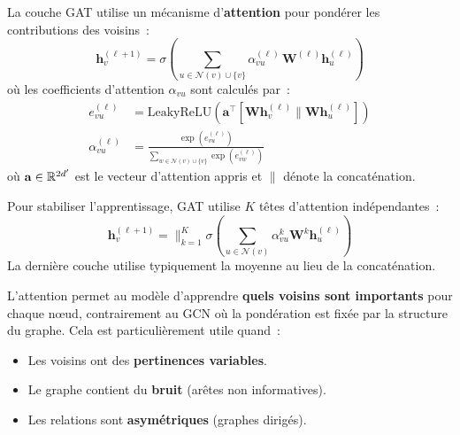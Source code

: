 \begin{definition}
La couche GAT utilise un m\'ecanisme d'\textbf{attention} pour pond\'erer les
contributions des voisins~:
\[
    \mathbf{h}_v^{(\ell+1)} = \sigma\!\left(\sum_{u \in \mathcal{N}(v) \cup \{v\}}
    \alpha_{vu}^{(\ell)}\, \mathbf{W}^{(\ell)} \mathbf{h}_u^{(\ell)}\right)
\]
o\`u les coefficients d'attention $\alpha_{vu}$ sont calcul\'es par~:
\begin{align}
    e_{vu}^{(\ell)} &= \text{LeakyReLU}\!\left(\mathbf{a}^{\top}\!
    \left[\mathbf{W}\mathbf{h}_v^{(\ell)} \| \mathbf{W}\mathbf{h}_u^{(\ell)}\right]\right) \\
    \alpha_{vu}^{(\ell)} &= \frac{\exp(e_{vu}^{(\ell)})}{\sum_{w \in \mathcal{N}(v) \cup \{v\}}
    \exp(e_{vw}^{(\ell)})}
\end{align}
o\`u $\mathbf{a} \in \mathbb{R}^{2d'}$ est le vecteur d'attention appris et $\|$ d\'enote
la concat\'enation.
\end{definition}

\begin{remarque}
Pour stabiliser l'apprentissage, GAT utilise $K$ t\^etes d'attention
ind\'ependantes~:
\[
    \mathbf{h}_v^{(\ell+1)} = \Big\|_{k=1}^{K} \sigma\!\left(\sum_{u \in \mathcal{N}(v)}
    \alpha_{vu}^{k} \mathbf{W}^k \mathbf{h}_u^{(\ell)}\right)
\]
La derni\`ere couche utilise typiquement la moyenne au lieu de la concat\'enation.
\end{remarque}

\begin{intuition}[title=\textbf{Pourquoi l'attention~?}]
L'attention permet au mod\`ele d'apprendre \textbf{quels voisins sont importants}
pour chaque n\oe ud, contrairement au GCN o\`u la pond\'eration est fix\'ee par
la structure du graphe. Cela est particuli\`erement utile quand~:
\begin{itemize}
    \item Les voisins ont des \textbf{pertinences variables}.
    \item Le graphe contient du \textbf{bruit} (ar\^etes non informatives).
    \item Les relations sont \textbf{asym\'etriques} (graphes dirig\'es).
\end{itemize}
\end{intuition}

